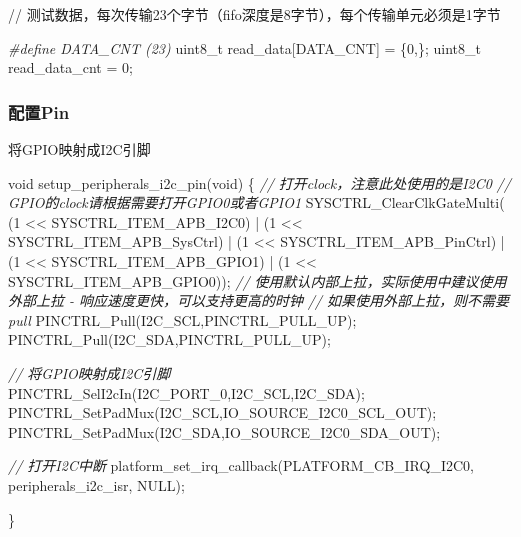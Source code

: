 \documentclass[
  12pt,
]{book}
\newenvironment{Shaded}{\begin{snugshade}}{\end{snugshade}}
\newcommand{\CommentTok}[1]{\textcolor[rgb]{0.56,0.35,0.01}{\textit{#1}}}
\newcommand{\DataTypeTok}[1]{\textcolor[rgb]{0.13,0.29,0.53}{#1}}
\newcommand{\DecValTok}[1]{\textcolor[rgb]{0.00,0.00,0.81}{#1}}
\newcommand{\NormalTok}[1]{#1}
\newcommand{\PreprocessorTok}[1]{\textcolor[rgb]{0.56,0.35,0.01}{\textit{#1}}}
\begin{document}
// 测试数据，每次传输23个字节（fifo深度是8字节），每个传输单元必须是1字节

\begin{Shaded}
\begin{Highlighting}[]
\PreprocessorTok{#define DATA_CNT (23)}
\DataTypeTok{uint8_t}\NormalTok{ read_data[DATA_CNT] = \{}\DecValTok{0}\NormalTok{,\};}
\DataTypeTok{uint8_t}\NormalTok{ read_data_cnt = }\DecValTok{0}\NormalTok{;}
\end{Highlighting}
\end{Shaded}

\hypertarget{ux914dux7f6epin-4}{%
\subsubsection{配置Pin}\label{ux914dux7f6epin-4}}

将GPIO映射成I2C引脚

\begin{Shaded}
\begin{Highlighting}[]
\DataTypeTok{void}\NormalTok{ setup_peripherals_i2c_pin(}\DataTypeTok{void}\NormalTok{)}
\NormalTok{\{}
  \CommentTok{// 打开clock，注意此处使用的是I2C0}
  \CommentTok{// GPIO的clock请根据需要打开GPIO0或者GPIO1}
\NormalTok{  SYSCTRL_ClearClkGateMulti(    (}\DecValTok{1}\NormalTok{ << SYSCTRL_ITEM_APB_I2C0)}
\NormalTok{                                | (}\DecValTok{1}\NormalTok{ << SYSCTRL_ITEM_APB_SysCtrl)}
\NormalTok{                                | (}\DecValTok{1}\NormalTok{ << SYSCTRL_ITEM_APB_PinCtrl)}
\NormalTok{                                | (}\DecValTok{1}\NormalTok{ << SYSCTRL_ITEM_APB_GPIO1)}
\NormalTok{                                | (}\DecValTok{1}\NormalTok{ << SYSCTRL_ITEM_APB_GPIO0));}
  \CommentTok{// 使用默认内部上拉，实际使用中建议使用外部上拉 - 响应速度更快，可以支持更高的时钟}
  \CommentTok{// 如果使用外部上拉，则不需要pull}
\NormalTok{  PINCTRL_Pull(I2C_SCL,PINCTRL_PULL_UP);}
\NormalTok{  PINCTRL_Pull(I2C_SDA,PINCTRL_PULL_UP);}
  
  \CommentTok{// 将GPIO映射成I2C引脚}
\NormalTok{  PINCTRL_SelI2cIn(I2C_PORT_0,I2C_SCL,I2C_SDA);}
\NormalTok{  PINCTRL_SetPadMux(I2C_SCL,IO_SOURCE_I2C0_SCL_OUT);}
\NormalTok{  PINCTRL_SetPadMux(I2C_SDA,IO_SOURCE_I2C0_SDA_OUT);}
  
  \CommentTok{// 打开I2C中断}
\NormalTok{  platform_set_irq_callback(PLATFORM_CB_IRQ_I2C0, peripherals_i2c_isr, NULL);}
  
\NormalTok{\}}
\end{Highlighting}
\end{Shaded}
\end{document}
